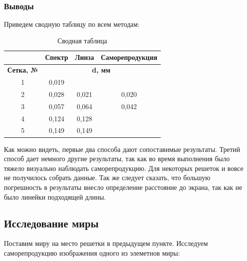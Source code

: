 \documentclass[a4paper, 12pt]{article}
\begin{document}
\subsubsection*{Выводы}

Приведем сводную таблицу по всем методам:

\begin{table}[H]
	\centering
	\begin{tabular}{|c|ccc|}
	\hline
	\textbf{}         & \multicolumn{1}{c|}{\textbf{Спектр}} & \multicolumn{1}{c|}{\textbf{Линза}} & \textbf{Саморепродукция} \\ \hline
	\textbf{Сетка, №} & \multicolumn{3}{c|}{\textbf{d, мм}}                                                                   \\ \hline
	1                 & \multicolumn{1}{c|}{0,019}           & \multicolumn{1}{c|}{}               &                          \\ \hline
	2                 & \multicolumn{1}{c|}{0,028}           & \multicolumn{1}{c|}{0,021}          & 0,020                    \\ \hline
	3                 & \multicolumn{1}{c|}{0,057}           & \multicolumn{1}{c|}{0,064}          & 0,042                    \\ \hline
	4                 & \multicolumn{1}{c|}{0,124}           & \multicolumn{1}{c|}{0,128}          &                          \\ \hline
	5                 & \multicolumn{1}{c|}{0,149}           & \multicolumn{1}{c|}{0,149}          &                          \\ \hline
	\end{tabular}
	\caption{Сводная таблица}
	\label{tab:res}
	\end{table}

Как можно видеть, первые два способа дают сопоставимые результаты. Третий способ дает немного другие результаты, так как во время выполнения было тяжело визуально наблюдать саморепродукцию. Для некоторых решеток и вовсе не получилось собрать данные.
Так же следует сказать, что большую погрешность в результаты внесло определение расстояние до экрана, так как не было линейки подходящей длины.

\subsection{Исследование миры}

Поставим миру на место решетки в предыдущем пункте. Исследуем саморепродукцию изображения одного из элеметнов миры:
\end{document}
